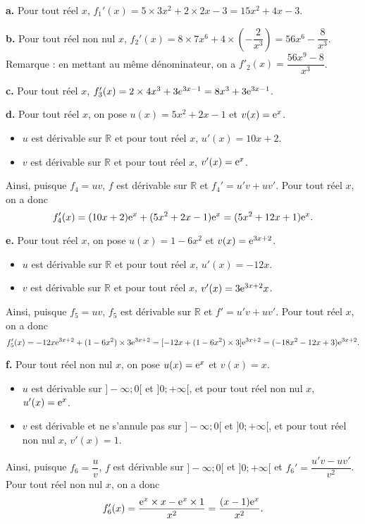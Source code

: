 \documentclass[11pt,fleqn]{book} %
\begin{document}
\begin{solution} \textbf{a.}  Pour tout réel $x$, $f_1'(x)=5\times 3x^2 + 2 \times 2x -3 = 15x^2+4x-3$.

\textbf{b.} Pour tout réel non nul $x$, $f_2'(x)=8\times 7x^6 + 4 \times \left(-\dfrac{2}{x^3}\right)=56x^6-\dfrac{8}{x^3}$.\\
Remarque : en mettant au même dénominateur, on a $f'_2(x)=\dfrac{56x^9-8}{x^3}$.

\textbf{c.} Pour tout réel $x$, $f_3'(x)=2\times 4x^3+3e^{3x-1}=8x^3+3\mathrm{e}^{3x-1}$.

\textbf{d.} Pour tout réel $x$, on pose $u(x)=5x^2+2x-1$ et $v(x)=\mathrm{e}^x$.
\begin{itemize}
\item $u$ est dérivable sur $\mathbb{R}$ et pour tout réel $x$, $u'(x)=10x+2$.
\item $v$ est dérivable sur $\mathbb{R}$ et pour tout réel $x$, $v'(x)=\mathrm{e}^x$.
\end{itemize}
Ainsi, puisque $f_4=uv$, $f$ est dérivable sur $\mathbb{R}$ et $f_4'=u'v+uv'$. Pour tout réel $x$, on a donc
\[ f_4'(x)=(10x+2)\mathrm{e}^x+(5x^2+2x-1)\mathrm{e}^x=(5x^2+12x+1)\mathrm{e}^x.\]

\textbf{e.} Pour tout réel $x$, on pose $u(x)=1-6x^2$ et $v(x)=\mathrm{e}^{3x+2}$.
\begin{itemize}
\item $u$ est dérivable sur $\mathbb{R}$ et pour tout réel $x$, $u'(x)=-12x$.
\item $v$ est dérivable sur $\mathbb{R}$ et pour tout réel $x$, $v'(x)=3\mathrm{e}^{3x+2}x$.
\end{itemize}
Ainsi, puisque $f_5=uv$, $f_5$ est dérivable sur $\mathbb{R}$ et $f'=u'v+uv'$. Pour tout réel $x$, on a donc
\[ f_5'(x)=-12x\mathrm{e}^{3x+2}+(1-6x^2)\times 3\mathrm{e}^{3x+2}=[-12x+(1-6x^2)\times 3] \mathrm{e}^{3x+2}=(-18x^2-12x+3)\mathrm{e}^{3x+2}.\]

\textbf{f.} Pour tout réel non nul $x$, on pose $u(x)=\mathrm{e}^x$ et $v(x)=x$.
\begin{itemize}
\item $u$ est dérivable sur $]-\infty;0[$ et $]0;+\infty[$, et pour tout réel non nul $x$, $u'(x)=\mathrm{e}^x$.
\item $v$ est dérivable et ne s'annule pas sur $]-\infty;0[$ et $]0;+\infty[$, et pour tout réel non nul $x$, $v'(x)=1$.
\end{itemize}
Ainsi, puisque $f_6=\dfrac{u}{v}$, $f$ est dérivable sur $]-\infty;0[$ et $]0;+\infty[$ et $f_6'=\dfrac{u'v-uv'}{v^2}$. Pour tout réel non nul $x$, on a donc
\[ f_6'(x)=\dfrac{\mathrm{e}^x\times x-\mathrm{e}^x\times 1}{x^2}=\dfrac{(x-1)\mathrm{e}^x}{x^2}.\]


\end{solution}
\end{document}
